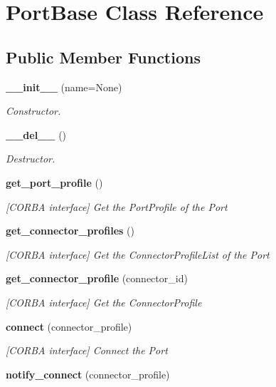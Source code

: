 \section{Port\-Base Class Reference}
\label{classPortBase}
\subsection*{Public Member Functions}
\begin{CompactItemize}
\item 
{\bf \_\-\_\-init\_\-\_\-} (name=None)
\begin{CompactList}\small\item\em Constructor. \item\end{CompactList}\item 
{\bf \_\-\_\-del\_\-\_\-} ()
\begin{CompactList}\small\item\em Destructor. \item\end{CompactList}\item 
{\bf get\_\-port\_\-profile} ()
\begin{CompactList}\small\item\em [CORBA interface] Get the Port\-Profile of the Port \item\end{CompactList}\item 
{\bf get\_\-connector\_\-profiles} ()
\begin{CompactList}\small\item\em [CORBA interface] Get the Connector\-Profile\-List of the Port \item\end{CompactList}\item 
{\bf get\_\-connector\_\-profile} (connector\_\-id)
\begin{CompactList}\small\item\em [CORBA interface] Get the Connector\-Profile \item\end{CompactList}\item 
{\bf connect} (connector\_\-profile)
\begin{CompactList}\small\item\em [CORBA interface] Connect the Port \item\end{CompactList}\item 
{\bf notify\_\-connect} (connector\_\-profile)

\end{CompactItemize}
